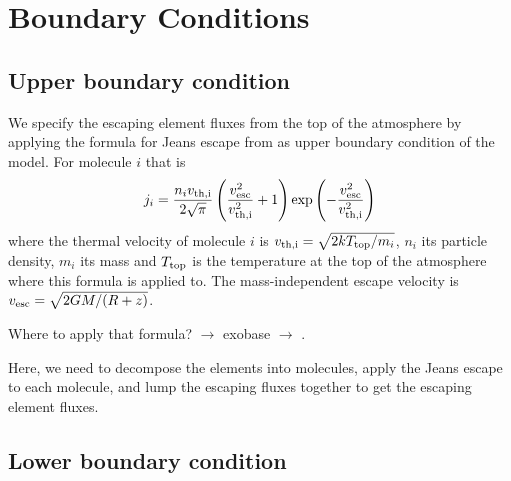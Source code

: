 \documentclass[11pt]{article}
\begin{document}
\section{Boundary Conditions}
\subsection{Upper boundary condition}
\label{UpperBound}

We specify the escaping element fluxes from the top of the atmosphere 
by applying the formula for Jeans escape from \citet{Tian2015} as
upper boundary condition of the model.  For molecule $i$ that is
\begin{equation}
  j_i = \frac{n_i v_{\rm th,i}}{2\sqrt{\pi}}
        \left(\frac{v_{\rm esc}^2}{v_{\rm th,i}^2}+1\right)
        \exp\left(-\frac{v_{\rm esc}^2}{v_{\rm th,i}^2}\right)
\end{equation}
where the thermal velocity of molecule $i$ is $v_{\rm th,i} =
\sqrt{2kT_{\rm top}/m_i}$, $n_i$ its particle density, $m_i$ its mass
and $T_{\rm top}$ is the temperature at the top of the atmosphere
where this formula is applied to. The mass-independent escape velocity
is $v_{\rm esc}=\sqrt{2GM/(R+z)}$.

\noindent Where to apply that formula? $\to$ exobase $\to$ \citet{Volkov2011}.

\noindent Here, we need to decompose the elements into molecules,
apply the Jeans escape to each molecule, and lump the escaping fluxes
together to get the escaping element fluxes. 

\subsection{Lower boundary condition}
\label{LowerBound}
\end{document}
